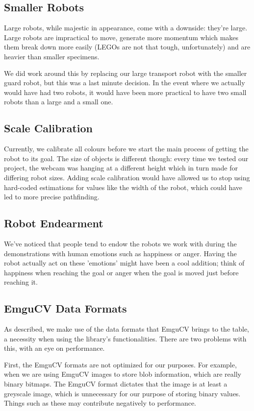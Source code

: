 \documentclass[10pt, abstracton]{scrartcl}
\begin{document}
\begin{appendices}
\subsection{Smaller Robots}
Large robots, while majestic in appearance, come with a downside: they're large. Large robots are impractical to move, generate more momentum which makes them break down more easily (LEGOs are not that tough, unfortunately) and are heavier than smaller specimens. 

We did work around this by replacing our large transport robot with the smaller guard robot, but this was a last minute decision. In the event where we actually would have had two robots, it would have been more practical to have two small robots than a large and a small one.

\subsection{Scale Calibration}
Currently, we calibrate all colours before we start the main process of getting the robot to its goal. The size of objects is different though: every time we tested our project, the webcam was hanging at a different height which in turn made for differing robot sizes. Adding scale calibration would have allowed us to stop using hard-coded estimations for values like the width of the robot, which could have led to more precise pathfinding.

\subsection{Robot Endearment}
We've noticed that people tend to endow the robots we work with during the demonstrations with human emotions such as happiness or anger. Having the robot actually act on these 'emotions' might have been a cool addition; think of happiness when reaching the goal or anger when the goal is moved just before reaching it.

\subsection{EmguCV Data Formats}
\label{sec:emgucvFormats}
As described, we make use of the data formats that EmguCV brings to the table, a necessity when using the library's functionalities. There are two problems with this, with an eye on performance.

First, the EmguCV formats are not optimized for our purposes. For example, when we are using EmguCV images to store blob information, which are really binary bitmaps. The EmguCV format dictates that the image is at least a greyscale image, which is unnecessary for our purpose of storing binary values. Things such as these may contribute negatively to performance.


\end{appendices}
\end{document}
